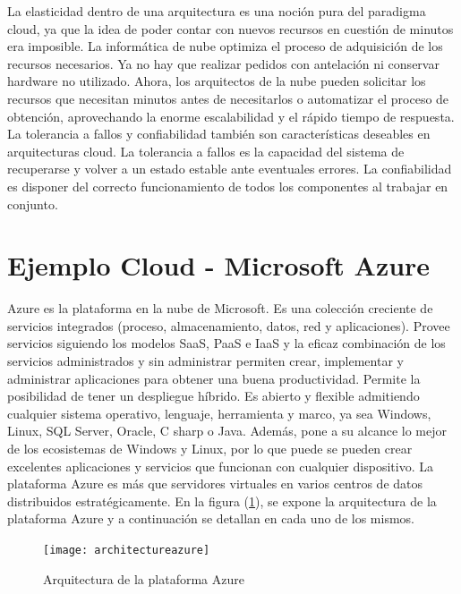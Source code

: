 La elasticidad dentro de una arquitectura es una noción pura del paradigma cloud, ya que la idea de poder contar con nuevos recursos en cuestión de minutos era imposible. La informática de nube optimiza el proceso de adquisición de los recursos necesarios. Ya no hay que realizar pedidos con antelación ni conservar hardware no utilizado. Ahora, los arquitectos de
la nube pueden solicitar los recursos que necesitan minutos antes de necesitarlos o automatizar el proceso de obtención, aprovechando la enorme escalabilidad y el rápido tiempo de respuesta.
La tolerancia a fallos y confiabilidad también son características deseables en arquitecturas cloud. La tolerancia a fallos es la capacidad del sistema de recuperarse y volver a un estado estable ante eventuales errores. La confiabilidad es disponer del correcto funcionamiento de todos los componentes al trabajar en conjunto.



\section{Ejemplo Cloud - Microsoft Azure}

Azure es la plataforma en la nube de Microsoft. Es una colección creciente de servicios integrados (proceso, almacenamiento, datos, red y aplicaciones).
Provee servicios siguiendo los modelos SaaS, PaaS e IaaS y la eficaz combinación de los servicios administrados y sin administrar permiten crear, implementar y administrar aplicaciones para obtener una buena productividad. Permite la posibilidad de tener un despliegue híbrido. Es abierto y flexible admitiendo cualquier sistema operativo, lenguaje, herramienta y marco, ya sea Windows, Linux, SQL Server, Oracle, C sharp o Java. Además, pone a su alcance lo mejor de los ecosistemas de Windows y Linux, por lo que puede se pueden crear excelentes aplicaciones y servicios que funcionan con cualquier dispositivo.
La plataforma Azure es más que servidores virtuales en varios centros de datos distribuidos estratégicamente. En la figura (\ref{fig:architectureazure}), se expone la arquitectura de la plataforma Azure y a continuación se detallan en cada uno de los mismos.

\begin{figure}[h!]
    \centering
    \texttt{[image: architectureazure]}
    \caption{Arquitectura de la plataforma Azure}   \label{fig:architectureazure}
\end{figure}



